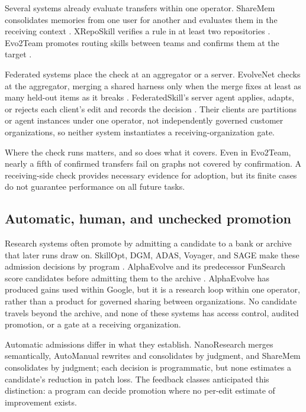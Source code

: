 Several systems already evaluate transfers within one operator. ShareMem consolidates memories from one user for another and evaluates them in the receiving context \cite{hu2026sharemem}. XRepoSkill verifies a rule in at least two repositories \cite{guo2026xreposkill}. Evo2Team promotes routing skills between teams and confirms them at the target \cite{wang2026evo2team}.

Federated systems place the check at an aggregator or a server. EvolveNet checks at the aggregator, merging a shared harness only when the merge fixes at least as many held-out items as it breaks \cite{nie2026evolvenet}. FederatedSkill's server agent applies, adapts, or rejects each client's edit and records the decision \cite{yang2026federatedskill}. Their clients are partitions or agent instances under one operator, not independently governed customer organizations, so neither system instantiates a receiving-organization gate.

Where the check runs matters, and so does what it covers. Even in Evo2Team, nearly a fifth of confirmed transfers fail on graphs not covered by confirmation. A receiving-side check provides necessary evidence for adoption, but its finite cases do not guarantee performance on all future tasks.

\subsection{Automatic, human, and unchecked promotion}\label{automatic-human-and-unchecked-promotion}

Research systems often promote by admitting a candidate to a bank or archive that later runs draw on. SkillOpt, DGM, ADAS, Voyager, and SAGE make these admission decisions by program \cite{yang2026skillopt, zhang2025darwin, hu2024adas, wang2023voyager, wang2025sage}. AlphaEvolve and its predecessor FunSearch score candidates before admitting them to the archive \cite{alphaevolve2025, romeraparedes2024funsearch}. AlphaEvolve has produced gains used within Google, but it is a research loop within one operator, rather than a product for governed sharing between organizations. No candidate travels beyond the archive, and none of these systems has access control, audited promotion, or a gate at a receiving organization.

Automatic admissions differ in what they establish. NanoResearch merges semantically, AutoManual rewrites and consolidates by judgment, and ShareMem consolidates by judgment; each decision is programmatic, but none estimates a candidate's reduction in patch loss. The feedback classes anticipated this distinction: a program can decide promotion where no per-edit estimate of improvement exists.

